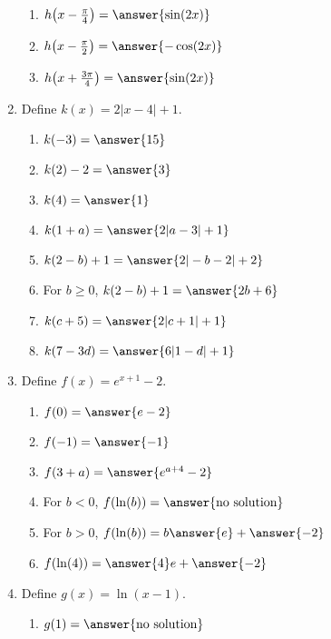 \documentclass{ximera}
\begin{document}
\begin{exercise}
\begin{enumerate}
\begin{enumerate}
\item $h\!\left(x-\frac{\pi}{4}\right) = \answer{\sin(2x)}$

\item $h\!\left(x-\frac{\pi}{2}\right) = \answer{-\cos(2x)}$

\item $h\!\left(x+\frac{3\pi}{4}\right) = \answer{\sin(2x)}$
\end{enumerate}


\item Define $k(x)= 2|x-4|+1$.
\begin{enumerate}
\item $k(-3) = \answer{15}$

\item $k(2) -2 = \answer{3}$

\item $k(4) = \answer{1}$

\item $k(1+a)=\answer{2|a-3| +1}$

\item $k(2-b) +1 = \answer{2|-b-2|+2}$

\item For $b\geq0$, $k(2-b) +1 = \answer{2b+6}$

\item $k(c+5) = \answer{2|c+1|+1}$

\item $k(7-3d) = \answer{6|1-d|+1}$
\end{enumerate}

\item Define $f(x)= e^{x+1} -2$.
\begin{enumerate}
\item $f(0) = \answer{e-2}$

\item $f(-1) = \answer{-1}$

\item $f(3+a)=\answer{e^{a+4}-2}$

\item For $b<0$, $f(\ln(b)) = \answer{\text{no solution}}$

\item For $b>0$, $f(\ln(b)) = b\answer{e} + \answer{-2}$

\item $f(\ln(4)) = \answer{4}e + \answer{-2}$
\end{enumerate}

\item Define $g(x)= \ln(x-1)$.
\begin{enumerate}
\item $g(1) = \answer{\text{no solution}}$


\end{enumerate}
\end{enumerate}
\end{exercise}
\end{document}
